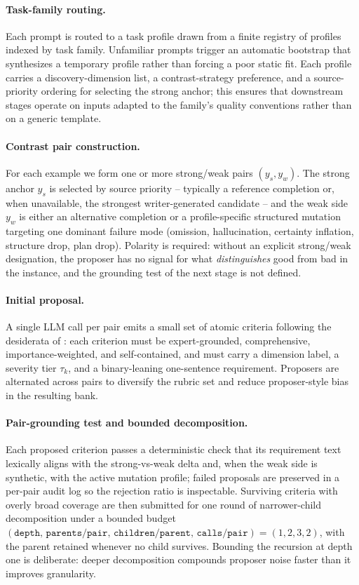 \paragraph{Task-family routing.}
Each prompt is routed to a task profile drawn from a finite registry
of profiles indexed by task family.  Unfamiliar prompts trigger an
automatic bootstrap that synthesizes a temporary profile rather than
forcing a poor static fit.  Each profile carries a discovery-dimension
list, a contrast-strategy preference, and a source-priority ordering
for selecting the strong anchor; this ensures that downstream stages
operate on inputs adapted to the family's quality conventions rather
than on a generic template.

\paragraph{Contrast pair construction.}
For each example we form one or more strong/weak pairs $(y_s, y_w)$.
The strong anchor $y_s$ is selected by source priority -- typically a
reference completion or, when unavailable, the strongest
writer-generated candidate -- and the weak side $y_w$ is either an
alternative completion or a profile-specific structured mutation
targeting one dominant failure mode (omission, hallucination,
certainty inflation, structure drop, plan drop).  Polarity is
required: without an explicit strong/weak designation, the proposer
has no signal for what \emph{distinguishes} good from bad in the
instance, and the grounding test of the next stage is not defined.

\paragraph{Initial proposal.}
A single LLM call per pair emits a small set of atomic criteria
following the desiderata of \citet{gunjal2025rar}: each criterion
must be expert-grounded, comprehensive, importance-weighted, and
self-contained, and must carry a dimension label, a severity tier
$\tau_k$, and a binary-leaning one-sentence requirement.  Proposers
are alternated across pairs to diversify the rubric set and reduce
proposer-style bias in the resulting bank.

\paragraph{Pair-grounding test and bounded decomposition.}
Each proposed criterion passes a deterministic check that its
requirement text lexically aligns with the strong-vs-weak delta and,
when the weak side is synthetic, with the active mutation profile;
failed proposals are preserved in a per-pair audit log so the
rejection ratio is inspectable.  Surviving criteria with overly broad
coverage are then submitted for one round of narrower-child
decomposition under a bounded budget
$(\texttt{depth},\,\texttt{parents/pair},\,\texttt{children/parent},\,\texttt{calls/pair}) = (1, 2, 3, 2)$,
with the parent retained whenever no child survives.  Bounding the
recursion at depth one is deliberate: deeper decomposition compounds
proposer noise faster than it improves granularity.

